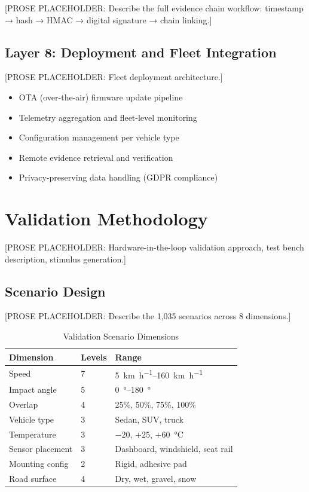 \documentclass[conference,twocolumn]{IEEEtran}
\begin{document}
[PROSE PLACEHOLDER: Describe the full evidence chain workflow: timestamp → hash → HMAC → digital signature → chain linking.]

\subsection{Layer 8: Deployment and Fleet Integration}

[PROSE PLACEHOLDER: Fleet deployment architecture.]

\begin{itemize}
  \item OTA (over-the-air) firmware update pipeline
  \item Telemetry aggregation and fleet-level monitoring
  \item Configuration management per vehicle type
  \item Remote evidence retrieval and verification
  \item Privacy-preserving data handling (GDPR compliance)
\end{itemize}

\section{Validation Methodology}

[PROSE PLACEHOLDER: Hardware-in-the-loop validation approach, test bench description, stimulus generation.]

\subsection{Scenario Design}

[PROSE PLACEHOLDER: Describe the 1,035 scenarios across 8 dimensions.]

\begin{table}[t]
\centering
\caption{Validation Scenario Dimensions}
\label{tab:scenario-dimensions}
\small
\renewcommand{\arraystretch}{1.15}
\begin{tabular}{@{}l l l@{}}
\toprule
\textbf{Dimension} & \textbf{Levels} & \textbf{Range} \\
\midrule
Speed           & 7  & \SIrange{5}{160}{\kilo\meter\per\hour} \\
Impact angle    & 5  & \SIrange{0}{180}{\degree} \\
Overlap         & 4  & 25\%, 50\%, 75\%, 100\% \\
Vehicle type    & 3  & Sedan, SUV, truck \\
Temperature     & 3  & $-20$, $+25$, $+60$~\si{\celsius} \\
Sensor placement& 3  & Dashboard, windshield, seat rail \\
Mounting config & 2  & Rigid, adhesive pad \\
Road surface    & 4  & Dry, wet, gravel, snow \\
\bottomrule
\end{tabular}
\end{table}
\end{document}
